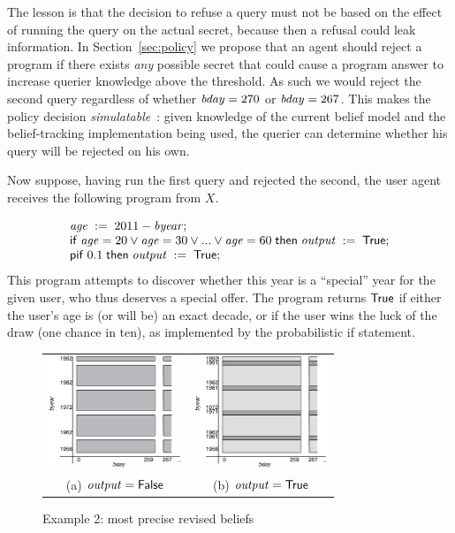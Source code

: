 The lesson is that the decision to refuse a query must not be based on
the effect of running the query on the actual secret, because then a
refusal could leak information.  In Section~\ref{sec:policy} we
propose that an agent should reject a program if there exists
\emph{any} possible secret that could cause a program answer to
increase querier knowledge above the threshold. As such we would
reject the second query regardless of whether $\mathit{bday} = 270$ or
$\mathit{bday} = 267$. This makes the policy decision
\emph{simulatable}~\cite{kenthapadi05simulatable}: given knowledge of
the current belief model and the belief-tracking implementation being
used, the querier can determine whether his query will be rejected on
his own.

 Now suppose, having run the first
query and rejected the second, the user agent receives the following
program from $X$.
\begin{example}
\label{ex:specyear}
\begin{displaymath}
\begin{array}{l}
{\ensuremath{\mathit{age}}}\;:=\;{2011 - \mathit{byear}}; \\
\mathsf{if}\; {\mathit{age} = 20 \vee \mathit{age} = 30 \vee ... \vee \mathit{age} = 60}\;\mathsf{then}\;
{\mathit{output}}\;:=\;{\mathsf{True}};\\
\mathsf{pif}\;{0.1}\;\mathsf{then}\;{{\mathit{output}}\;:=\;{\mathsf{True}}};
\end{array}
\end{displaymath}
This program attempts to discover whether this year is a ``special''
year for the given user, who thus deserves a special offer.  The
program returns $\mathsf{True}$ if either the user's age is (or will be) an
exact decade, or if the user wins the luck of the draw (one chance in
ten), as implemented by the probabilistic if statement.
\end{example}

\begin{figure}
\centering
\begin{tabular}{cc}
\includegraphics[width=4cm]{figures/bands1.pdf} &
\includegraphics[width=4cm]{figures/bands2.pdf} \\
(a) $\mathit{output} = \mathsf{False}$ & 
(b) $\mathit{output} = \mathsf{True}$ \\
\end{tabular}
\caption{Example 2: most precise revised beliefs}
\label{fig:bands}
\end{figure}


